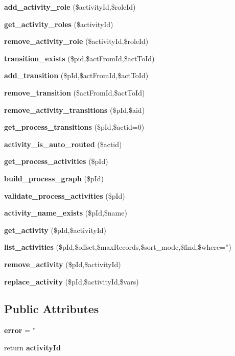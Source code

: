 \begin{CompactItemize}
\item 
{\bf add\_\-activity\_\-role} (\$activity\-Id,\$role\-Id)
\item 
{\bf get\_\-activity\_\-roles} (\$activity\-Id)
\item 
{\bf remove\_\-activity\_\-role} (\$activity\-Id,\$role\-Id)
\item 
{\bf transition\_\-exists} (\$pid,\$act\-From\-Id,\$act\-To\-Id)
\item 
{\bf add\_\-transition} (\$p\-Id,\$act\-From\-Id,\$act\-To\-Id)
\item 
{\bf remove\_\-transition} (\$act\-From\-Id,\$act\-To\-Id)
\item 
{\bf remove\_\-activity\_\-transitions} (\$p\-Id,\$aid)
\item 
{\bf get\_\-process\_\-transitions} (\$p\-Id,\$actid=0)
\item 
{\bf activity\_\-is\_\-auto\_\-routed} (\$actid)
\item 
{\bf get\_\-process\_\-activities} (\$p\-Id)
\item 
{\bf build\_\-process\_\-graph} (\$p\-Id)
\item 
{\bf validate\_\-process\_\-activities} (\$p\-Id)
\item 
{\bf activity\_\-name\_\-exists} (\$p\-Id,\$name)
\item 
{\bf get\_\-activity} (\$p\-Id,\$activity\-Id)
\item 
{\bf list\_\-activities} (\$p\-Id,\$offset,\$max\-Records,\$sort\_\-mode,\$find,\$where='')
\item 
{\bf remove\_\-activity} (\$p\-Id,\$activity\-Id)
\item 
{\bf replace\_\-activity} (\$p\-Id,\$activity\-Id,\$vars)
\end{CompactItemize}
\subsection*{Public Attributes}
\begin{CompactItemize}
\item 
{}
{\bf error} = ''\label{classActivityManager_m0}

\item 
{}
return {\bf activity\-Id}\label{classActivityManager_m1}

\end{CompactItemize}


